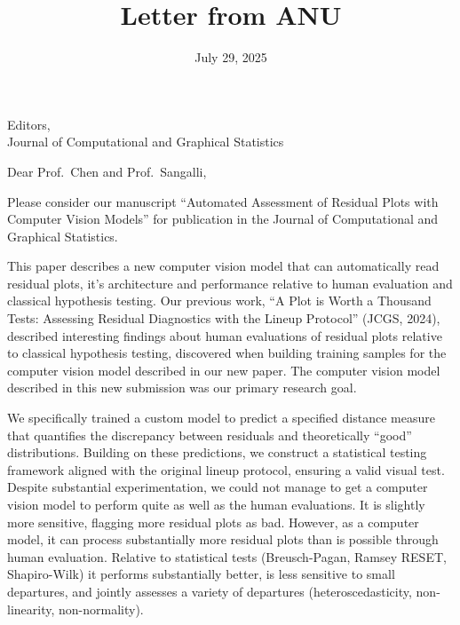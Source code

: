 \documentclass[
  12pt,
  letterpaper]{letter}
\title{Letter from ANU}
\author{\hspace{0pt}}
\date{July 29, 2025}
\begin{document}


\signature{
\hspace{0pt}}
\address{Australian National University\\Research School of Finance,
Actuarial Studies and Statistics\\26C Kingsley
Street\\Canberra 2600\\Australia\\[2mm]}
\begin{letter}{Editors,\\Journal of Computational and Graphical
Statistics}
\opening{Dear Prof.~Chen and Prof.~Sangalli,}


Please consider our manuscript ``Automated Assessment of Residual Plots
with Computer Vision Models'' for publication in the Journal of
Computational and Graphical Statistics.

This paper describes a new computer vision model that can automatically
read residual plots, it's architecture and performance relative to human
evaluation and classical hypothesis testing. Our previous work, ``A Plot
is Worth a Thousand Tests: Assessing Residual Diagnostics with the
Lineup Protocol'' (JCGS, 2024), described interesting findings about
human evaluations of residual plots relative to classical hypothesis
testing, discovered when building training samples for the computer
vision model described in our new paper. The computer vision model
described in this new submission was our primary research goal.

We specifically trained a custom model to predict a specified distance
measure that quantifies the discrepancy between residuals and
theoretically ``good'' distributions. Building on these predictions, we
construct a statistical testing framework aligned with the original
lineup protocol, ensuring a valid visual test. Despite substantial
experimentation, we could not manage to get a computer vision model to
perform quite as well as the human evaluations. It is slightly more
sensitive, flagging more residual plots as bad. However, as a computer
model, it can process substantially more residual plots than is possible
through human evaluation. Relative to statistical tests (Breusch-Pagan,
Ramsey RESET, Shapiro-Wilk) it performs substantially better, is less
sensitive to small departures, and jointly assesses a variety of
departures (heteroscedasticity, non-linearity, non-normality).


\end{letter}
\end{document}

